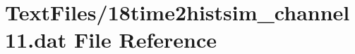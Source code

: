 \hypertarget{18time2histsim__channel11_8dat}{}\section{Text\+Files/18time2histsim\+\_\+channel11.dat File Reference}
\label{18time2histsim__channel11_8dat}
